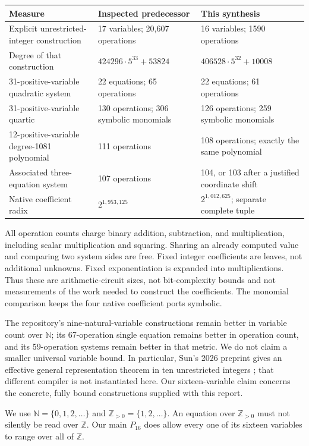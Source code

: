 \documentclass[11pt]{article}
\theoremstyle{remark}\newtheorem{remark}[theorem]{Remark}
\newcommand{\Z}{\mathbb Z}\newcommand{\N}{\mathbb N}
\newcommand{\Pos}{\mathbb Z_{>0}}\newcommand{\Q}{\mathbb Q}
\newcommand{\SignedOps}{1590}
\begin{document}
\begin{center}\small
\begin{tabular}{p{43mm}p{39mm}p{55mm}}
\toprule
Measure & Inspected predecessor & This synthesis\\
\midrule
Explicit unrestricted-integer construction & 17 variables; 20,607 operations & 16 variables; \SignedOps{} operations\\
Degree of that construction & $424296\cdot5^{33}+53824$ & $406528\cdot5^{32}+10008$\\
31-positive-variable quadratic system & 22 equations; 65 operations & 22 equations; 61 operations\\
31-positive-variable quartic & 130 operations; 306 symbolic monomials & 126 operations; 259 symbolic monomials\\
12-positive-variable degree-1081 polynomial & 111 operations & 108 operations; exactly the same polynomial\\
Associated three-equation system & 107 operations & 104, or 103 after a justified coordinate shift\\
Native coefficient radix & $2^{1,953,125}$ & $2^{1,012,625}$; separate complete tuple\\
\bottomrule
\end{tabular}\end{center}

All operation counts charge binary addition, subtraction, and multiplication,
including scalar multiplication and squaring. Sharing an already computed
value and comparing two system sides are free. Fixed integer coefficients
are leaves, not additional unknowns. Fixed exponentiation is expanded into
multiplications. Thus these are arithmetic-circuit sizes, not bit-complexity
bounds and not measurements of the work needed to construct the coefficients.
The monomial comparison keeps the four native coefficient ports symbolic.

The repository's nine-natural-variable constructions remain better in
variable count over $\N$; its 67-operation single equation remains better
in operation count, and its 59-operation systems remain better in that
metric. We do not claim a smaller universal variable bound. In particular,
Sun's 2026 preprint gives an effective general representation theorem in
ten unrestricted integers \cite{sun}; that different compiler is not
instantiated here. Our sixteen-variable claim concerns the concrete,
fully bound constructions supplied with this report.

We use $\N=\{0,1,2,\ldots\}$ and $\Pos=\{1,2,\ldots\}$.
An equation over $\Pos$ must not silently be read over $\Z$. Our main
$P_{16}$ does allow every one of its sixteen variables to range over all
of $\Z$.
\end{document}
